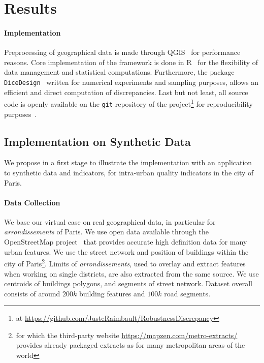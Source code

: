 \documentclass[runningheads,a4paper]{llncs2e/llncs}
\begin{document}
\section{Results}



\paragraph{Implementation}

Preprocessing of geographical data is made through QGIS~\cite{qgis2011quantum} for performance reasons. Core implementation of the framework is done in R~\cite{team2000r} for the flexibility of data management and statistical computations. Furthermore, the package \texttt{DiceDesign}~\cite{franco20092} written for numerical experiments and sampling purposes, allows an efficient and direct computation of discrepancies. Last but not least, all source code is openly available on the \texttt{git} repository of the project\footnote{at \url{https://github.com/JusteRaimbault/RobustnessDiscrepancy}} for reproducibility purposes~\cite{ram2013git}.




\subsection{Implementation on Synthetic Data}

We propose in a first stage to illustrate the implementation with an application to synthetic data and indicators, for intra-urban quality indicators in the city of Paris.

\paragraph{Data Collection}

We base our virtual case on real geographical data, in particular for \emph{arrondissements} of Paris. We use open data available through the OpenStreetMap project~\cite{bennett2010openstreetmap} that provides accurate high definition data for many urban features. We use the street network and position of buildings within the city of Paris\footnote{for which the third-party website \url{https://mapzen.com/metro-extracts/} provides already packaged extracts as for many metropolitan areas of the world}. Limits of \emph{arrondissements}, used to overlay and extract features when working on single districts, are also extracted from the same source. We use centroids of buildings polygons, and segments of street network. Dataset overall consists of around $200k$ building features and $100k$ road segments.
\end{document}
